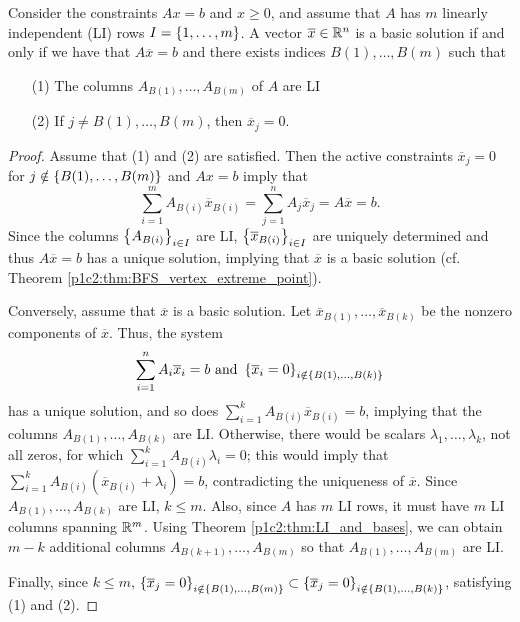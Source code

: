 \begin{theorem} \label{p1c3:thm:LI_and_bases}
	Consider the constraints $Ax = b$ and $x \geq 0$, and assume that $A$ has $m$ linearly independent (LI) rows $I = \left\{ 1,\dots,m \right \}$. A vector $\overline{x} \in \mathbb{R}^n$ is a basic solution if and only if we have that $A \overline{x} = b$ and there exists indices $B(1), \dots, B(m)$ such that
	\begin{enumerate}
		\item[(1)] The columns $A_{B(1)}, \dots, A_{B(m)}$ of $A$ are LI
		\item[(2)] If $j \neq B(1), \dots, B(m)$, then $\overline{x}_j = 0$.
	\end{enumerate} 
\end{theorem}

\begin{proof}
	Assume that (1) and (2) are satisfied. Then the active constraints $\overline{x}_j = 0$ for $j \notin \left\{ B(1), \dots, B(m) \right \}$ and $Ax = b$ imply that
%	
	\begin{equation*}
		\sum_{i=1}^m A_{B(i)}\overline{x}_{B(i)} = \sum_{j=1}^n A_j\overline{x}_j = A\overline{x} = b.
	\end{equation*}
%
	Since the columns $\left\{ A_{B(i)} \right \}_{i \in I}$ are LI, $\left\{ \overline{x}_{B(i)} \right \}_{i \in I}$ are uniquely determined and thus $A\overline{x} = b$ has a unique solution, implying that $\overline{x}$ is a basic solution (cf. Theorem \ref{p1c2:thm:BFS_vertex_extreme_point}).
	
	Conversely, assume that $\overline{x}$ is a basic solution. Let $\overline{x}_{B(1)}, \dots, \overline{x}_{B(k)}$ be the nonzero components of $\overline{x}$. Thus, the system 
%	
		\begin{equation*}
			\sum_{i=1}^n A_i\overline{x}_i = b \text{ and } \left\{ \overline{x}_i = 0 \right \}_{i \notin \left\{ B(1), \dots, B(k) \right \}}
		\end{equation*}
%
	has a unique solution, and so does $\sum_{i=1}^k A_{B(i)}\overline{x}_{B(i)} = b$, implying that the columns $A_{B(1)}, \dots, A_{B(k)}$ are LI. Otherwise, there would be scalars $\lambda_1,\dots, \lambda_k$, not all zeros, for which $\sum_{i=1}^k A_{B(i)}\lambda_i = 0$; this would imply that $\sum_{i=1}^k A_{B(i)}(\overline{x}_{B(i)} + \lambda_i) =b$, contradicting the uniqueness of $\overline{x}$.
	Since $A_{B(1)}, \dots, A_{B(k)}$ are LI, $k \leq m$. Also, since $A$ has $m$ LI rows, it must have $m$ LI columns spanning $\mathbb{R}^m$. Using Theorem \ref{p1c2:thm:LI_and_bases}, we can obtain $m-k$ additional columns $A_{B(k+1)}, \dots, A_{B(m)}$ so that $A_{B(1)}, \dots, A_{B(m)}$ are LI. 
	
	Finally, since $k \leq m $, $\left\{ \overline{x}_j = 0 \right \}_{i \notin \left\{ B(1), \dots, B(m) \right \}} \subset  \left\{ \overline{x}_j = 0 \right \}_{i \notin \left\{ B(1), \dots, B(k) \right \}}$, satisfying (1) and (2). \qedhere 		
\end{proof}	

